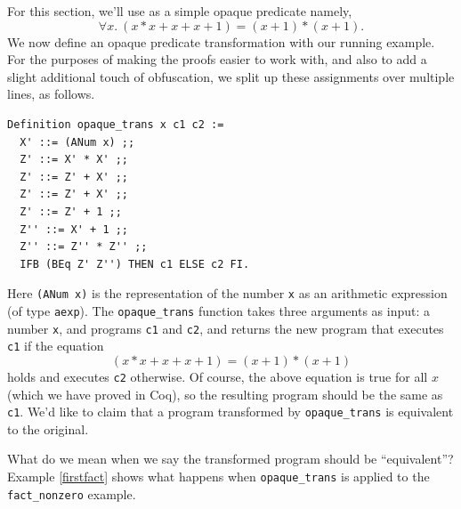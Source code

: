 \documentclass[compsoc,conference,a4paper,10pt,times]{IEEEtran}
\newtheorem{lemma}[theorem]{Lemma}
\begin{document}
For this section, we'll use as a simple opaque predicate namely,
    \[
    	\forall x.\ (x * x + x + x + 1) = (x + 1) * (x + 1).
    \]
We now define an opaque predicate transformation with our running example.  
    For the purposes of making the proofs easier to work with, and also to add a slight additional touch of obfuscation, we split up these assignments over multiple lines, as follows.
\begin{verbatim}
Definition opaque_trans x c1 c2 :=
  X' ::= (ANum x) ;;
  Z' ::= X' * X' ;;
  Z' ::= Z' + X' ;;
  Z' ::= Z' + X' ;;
  Z' ::= Z' + 1 ;;
  Z'' ::= X' + 1 ;;
  Z'' ::= Z'' * Z'' ;;
  IFB (BEq Z' Z'') THEN c1 ELSE c2 FI.
\end{verbatim}
Here \texttt{(ANum x)} is the representation of the number \texttt{x} as an arithmetic expression (of type \texttt{aexp}).  The \texttt{opaque\_trans} function takes three arguments as input: a number \texttt{x}, and programs \texttt{c1} and \texttt{c2}, and returns the new program that executes \texttt{c1} if the equation
\[
	(x * x + x + x + 1) = (x + 1) * (x + 1)
\]
holds and executes \texttt{c2} otherwise.  Of course, the above equation is true for all $x$ (which we have proved in Coq), so the resulting program should be the same as \texttt{c1}.  We'd like to claim that a program transformed by \texttt{opaque\_trans} is equivalent to the original.

What do we mean when we say the transformed program should be ``equivalent''?  Example \ref{firstfact} shows what happens when \texttt{opaque\_trans} is applied to the \texttt{fact\_nonzero} example.  


\end{document}
